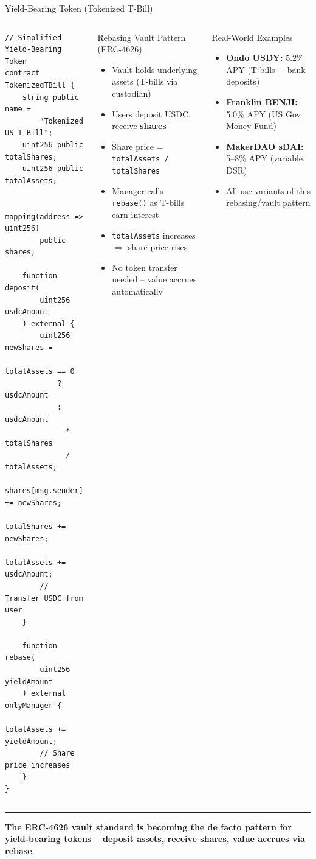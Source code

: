 \documentclass[8pt,aspectratio=169]{beamer}
\newcommand{\bottomnote}[1]{\vfill\vspace{-2mm}\textcolor{mllavender2}{\rule{\textwidth}{0.4pt}}\vspace{1mm}\footnotesize\textbf{#1}}
\begin{document}
\begin{frame}[fragile]{Yield-Bearing Token (Tokenized T-Bill)}
\begin{columns}[T]
\begin{lstlisting}
// Simplified Yield-Bearing Token
contract TokenizedTBill {
    string public name =
        "Tokenized US T-Bill";
    uint256 public totalShares;
    uint256 public totalAssets;

    mapping(address => uint256)
        public shares;

    function deposit(
        uint256 usdcAmount
    ) external {
        uint256 newShares =
            totalAssets == 0
            ? usdcAmount
            : usdcAmount
              * totalShares
              / totalAssets;
        shares[msg.sender] += newShares;
        totalShares += newShares;
        totalAssets += usdcAmount;
        // Transfer USDC from user
    }

    function rebase(
        uint256 yieldAmount
    ) external onlyManager {
        totalAssets += yieldAmount;
        // Share price increases
    }
}
\end{lstlisting}
\vspace{2mm}
\begin{block}{Rebasing Vault Pattern (ERC-4626)}
\footnotesize
\begin{itemize}
  \item Vault holds underlying assets (T-bills via custodian)
  \item Users deposit USDC, receive \textbf{shares}
  \item Share price = \texttt{totalAssets / totalShares}
  \item Manager calls \texttt{rebase()} as T-bills earn interest
  \item \texttt{totalAssets} increases $\Rightarrow$ share price rises
  \item No token transfer needed -- value accrues automatically
\end{itemize}
\end{block}
\vspace{2mm}
\begin{block}{Real-World Examples}
\footnotesize
\begin{itemize}
  \item \textbf{Ondo USDY:} 5.2\% APY (T-bills + bank deposits)
  \item \textbf{Franklin BENJI:} 5.0\% APY (US Gov Money Fund)
  \item \textbf{MakerDAO sDAI:} 5--8\% APY (variable, DSR)
  \item All use variants of this rebasing/vault pattern
\end{itemize}
\end{block}
\end{columns}
\bottomnote{The ERC-4626 vault standard is becoming the de facto pattern for yield-bearing tokens -- deposit assets, receive shares, value accrues via rebase}
\end{frame}
\end{document}
